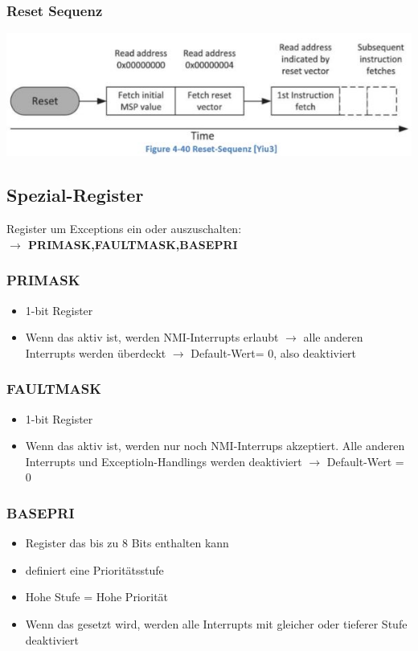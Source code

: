 \subsubsection{Reset Sequenz}
     \includegraphics{images/resetsequenz}
\subsection{Spezial-Register}     
Register um Exceptions ein oder auszuschalten:\\
\textbf{$\rightarrow$ PRIMASK,FAULTMASK,BASEPRI}
\begin{multicols}{2}
    \subsubsection{PRIMASK}
    \begin{itemize}
        \item 1-bit Register
        \item Wenn das aktiv ist, werden NMI-Interrupts erlaubt
        \subitem $\rightarrow$ alle anderen Interrupts werden überdeckt
        \subitem $\rightarrow$ Default-Wert= 0, also deaktiviert
    \end{itemize}
    
    \subsubsection{FAULTMASK}
    \begin{itemize}
        \item 1-bit Register
        \item Wenn das aktiv ist, werden nur noch NMI-Interrups akzeptiert.\newline
        Alle anderen Interrupts und Exceptioln-Handlings werden deaktiviert
        \subitem $\rightarrow$ Default-Wert = 0
    \end{itemize}
\end{multicols}

\subsubsection{BASEPRI}
\begin{itemize}
    \item Register das bis zu 8 Bits enthalten kann
    \item definiert eine Prioritätsstufe
    \item Hohe Stufe = Hohe Priorität
    \item Wenn das gesetzt wird, werden alle Interrupts mit gleicher oder tieferer Stufe deaktiviert
\end{itemize}

